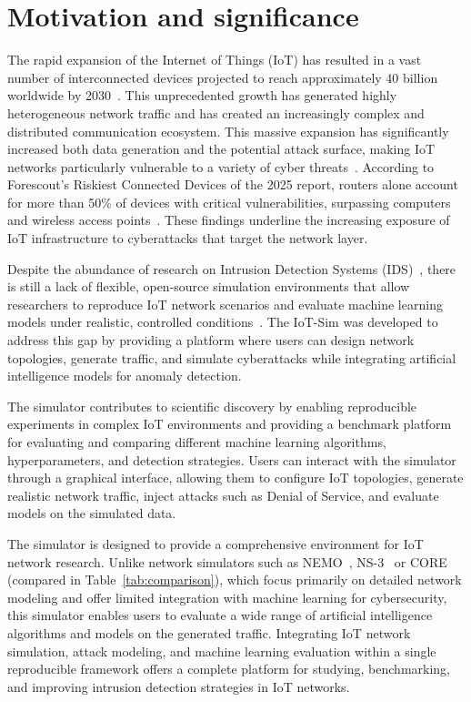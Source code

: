\section{Motivation and significance}
\label{sec:MotivationAndSignificance}
The rapid expansion of the Internet of Things (IoT) has resulted in a vast number of interconnected devices projected to reach approximately 40 billion worldwide by 2030~\cite{number_connected_iot_devices}. This unprecedented growth has generated highly heterogeneous network traffic and has created an increasingly complex and distributed communication ecosystem. This massive expansion has significantly increased both data generation and the potential attack surface, making IoT networks particularly vulnerable to a variety of cyber threats~\cite{iot_security_analysis}. According to Forescout’s Riskiest Connected Devices of the 2025 report, routers alone account for more than 50\% of devices with critical vulnerabilities, surpassing computers and wireless access points~\cite{forescout_2025_riskiest}. These findings underline the increasing exposure of IoT infrastructure to cyberattacks that target the network layer.

Despite the abundance of research on Intrusion Detection Systems (IDS)~\cite{intrusion_detection_systems, survey_IDS}, there is still a lack of flexible, open-source simulation environments that allow researchers to reproduce IoT network scenarios and evaluate machine learning models under realistic, controlled conditions~\cite{challenges_iot_simulators}. The IoT-Sim was developed to address this gap by providing a platform where users can design network topologies, generate traffic, and simulate cyberattacks while integrating artificial intelligence models for anomaly detection.

The simulator contributes to scientific discovery by enabling reproducible experiments in complex IoT environments and providing a benchmark platform for evaluating and comparing different machine learning algorithms, hyperparameters, and detection strategies. Users can interact with the simulator through a graphical interface, allowing them to configure IoT topologies, generate realistic network traffic, inject attacks such as Denial of Service, and evaluate models on the simulated data.

The simulator is designed to provide a comprehensive environment for IoT network research. Unlike network simulators such as NEMO~\cite{nemo}, NS-3~\cite{ns3} or CORE~\cite{core} (compared in Table~\ref{tab:comparison}), which focus primarily on detailed network modeling and offer limited integration with machine learning for cybersecurity, this simulator enables users to evaluate a wide range of artificial intelligence algorithms and models on the generated traffic. Integrating IoT network simulation, attack modeling, and machine learning evaluation within a single reproducible framework offers a complete platform for studying, benchmarking, and improving intrusion detection strategies in IoT networks.

